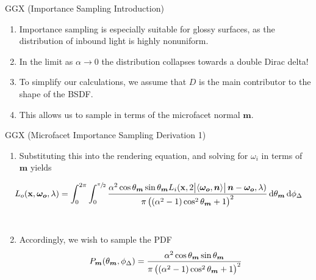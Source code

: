 \documentclass[10pt]{beamer}
\DeclarePairedDelimiter\ip{\langle }{\rangle}
\begin{document}
\begin{frame}{GGX (Importance Sampling Introduction)}
  \begin{enumerate}
  \item Importance sampling is especially suitable for glossy surfaces, as the distribution of inbound light is highly nonuniform.
  \item In the limit as \(\alpha \to 0\) the distribution collapses towards a double Dirac delta!
  \item To simplify our calculations, we assume that \(D\) is the main contributor to the shape of the BSDF.
  \item This allows us to sample in terms of the microfacet normal \(\bm m\).
  \end{enumerate}
\end{frame}

\begin{frame}{GGX (Microfacet Importance Sampling Derivation 1)}
  \begin{enumerate}
  \item Substituting this into the rendering equation, and solving for \(\omega_i\) in terms of \(\bm m\) yields
  \end{enumerate}
  \[L_{o}(\mathbf x, \bm {\omega_{o}}, \lambda) = \int_0^{2\pi}\int_0^{\sfrac{\pi}{2}} \frac{\alpha^2 \cos\theta_{\bm m} \sin\theta_{\bm m} L_i(\mathbf x, 2\abs{\ip{\bm{\omega_o}, \bm n}}\bm n-  \bm{\omega_o}, \lambda)}{\pi\del{\del{\alpha^2 - 1}\cos^2 \theta_{\bm m} + 1}^2} \dif\theta_{\bm m}\dif\phi_\Delta \]
  \\[0em]
  \begin{enumerate}
    \setcounter{enumi}{1}
  \item Accordingly, we wish to sample the PDF
    \[P_{\bm m}(\theta_{\bm m}, \phi_\Delta) = \frac{\alpha^2 \cos\theta_{\bm m} \sin\theta_{\bm m}}{\pi\del{\del{\alpha^2 - 1}\cos^2 \theta_{\bm m} + 1}^2}\]
  \end{enumerate}
\end{frame}
\end{document}

